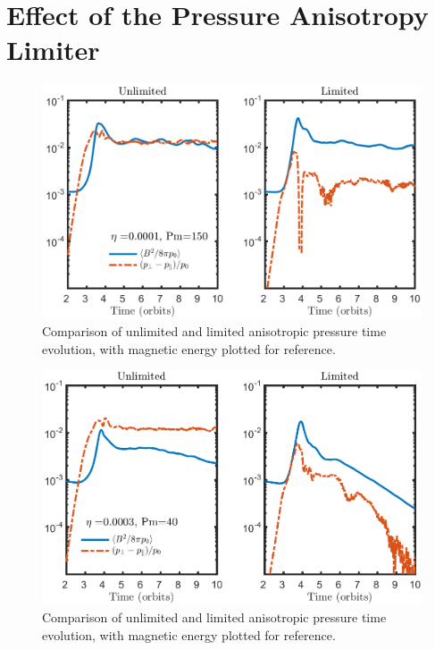 \section{Effect of the Pressure Anisotropy Limiter}\label{sec:palim}
\begin{figure}[h]
  \begin{center}  
    \includegraphics[width=\textwidth, angle=0.]{img/eta1-Pm150-PAME.png}
  \end{center}
  \caption{Comparison of unlimited and limited anisotropic pressure time evolution, with magnetic energy plotted for reference.}
  \label{fig:eta1Pm150PAME}
\end{figure}
%
\begin{figure}[h]
  \begin{center}  
    \includegraphics[width=\textwidth, angle=0.]{img/eta3-Pm40-PAME.png}
  \end{center}
  \caption{Comparison of unlimited and limited anisotropic pressure time evolution, with magnetic energy plotted for reference.}
  \label{fig:eta3Pm40PAME}
\end{figure}
